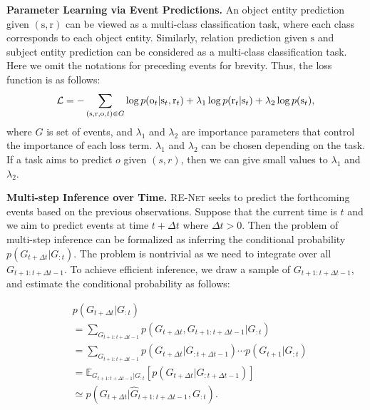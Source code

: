 \documentclass[11pt,a4paper]{article}
\newcommand{\prob}{p}
\newcommand{\calE}{G}
\newcommand{\method}{\textsc{RE-Net}\xspace}
\newcommand{\para}[1]{\smallskip\noindent\textbf{#1}}
\newcommand{\bs}{\mathrm{s}}
\newcommand{\br}{\mathrm{r}}
\newcommand{\bo}{\mathrm{o}}
\begin{document}
\para{Parameter Learning via Event Predictions.}
An object entity prediction given $(\bs,\br)$ can be viewed as a multi-class classification task, where each class corresponds to each object entity.
Similarly, relation prediction given $\bs$ and subject entity prediction can be considered as a multi-class classification task. 
Here we omit the notations for preceding events for brevity.
Thus, the loss function is as follows:
\begin{equation}
    \small \mathcal{L} = -\sum_{(\bs,\br,\bo,t) \in \calE}  \log\prob(\bo_t|\bs_t,\br_t) +\lambda_1 \log\prob(\br_t|\bs_t) + \lambda_2 \log\prob(\bs_t),
    \label{loss}
\end{equation}
where $\calE$ is set of events, and $\lambda_1$ and $\lambda_2$ are importance parameters that control the importance of each loss term. $\lambda_1$ and $\lambda_2$ can be chosen depending on the task. 
If a task aims to predict  $o$ given $(s,r)$, then we can give small values to $\lambda_1$ and $\lambda_2$.






\para{Multi-step Inference over Time.} 
\method seeks to predict the forthcoming events based on the previous observations. 
Suppose that the current time is $t$ and we aim to predict events at time $t + \Delta t$ where $\Delta t>0$. 
Then the problem of multi-step inference can be formalized as inferring the conditional probability {\small $\prob (\calE_{t+\Delta t}|\calE_{:t})$}. 
The problem is nontrivial as we need to integrate over all $\calE_{t+1:t+\Delta t-1}$. To achieve efficient inference, we draw a sample of $\calE_{t+1:t+\Delta t-1}$, and estimate the conditional probability as follows:

\small
\begin{align*}
	&\prob (\calE_{t+\Delta t}|\calE_{:t})\nonumber\\
	&= \sum_{\calE_{t+1:t+\Delta t-1}} \prob (\calE_{t+\Delta t}, \calE_{t+1:t+\Delta t-1}|\calE_{:t})\\ 
	&= \sum_{\calE_{t+1:t+\Delta t-1}} \prob(\calE_{t+\Delta t}|\calE_{:t+\Delta t-1})  \cdots  \prob(\calE_{t+1}|\calE_{:t})\\ 
	&= \mathbb{E}_{\calE_{t+1:t+\Delta t-1}|\calE_{:t}} [\prob(\calE_{t+\Delta t}|\calE_{:t+\Delta t-1})] \\
	&\simeq \prob(\calE_{t+\Delta t}|\hat{\calE}_{t+1:t+\Delta t-1},\calE_{:t}).
\end{align*}
\normalsize
\end{document}
